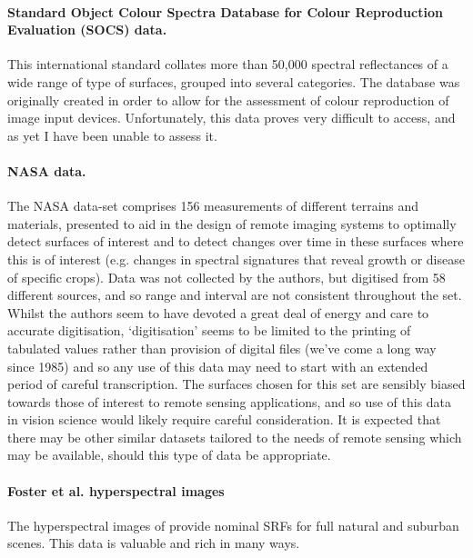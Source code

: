 \paragraph{Standard Object Colour Spectra Database for Colour Reproduction Evaluation (SOCS) data.}
This international standard \citep{tajima_development_1998,iso/tc_130_graphic_technology_iso/tr_2003} collates more than 50,000 spectral reflectances of a wide range of type of surfaces, grouped into several categories. The database was originally created in order to allow for the assessment of colour reproduction of image input devices. Unfortunately, this data proves very difficult to access, and as yet I have been unable to assess it.

\paragraph{NASA data.}
The NASA data-set \citep{david_e._bowker_spectral_1985} comprises 156 measurements of different terrains and materials, presented to aid in the design of remote imaging systems to optimally detect surfaces of interest and to detect changes over time in these surfaces where this is of interest (e.g. changes in spectral signatures that reveal growth or disease of specific crops). Data was not collected by the authors, but digitised from 58 different sources, and so range and interval are not consistent throughout the set. Whilst the authors seem to have devoted a great deal of energy and care to accurate digitisation, `digitisation' seems to be limited to the printing of tabulated values rather than provision of digital files (we've come a long way since 1985) and so any use of this data may need to start with an extended period of careful transcription. The surfaces chosen for this set are sensibly biased towards those of interest to remote sensing applications, and so use of this data in vision science would likely require careful consideration. It is expected that there may be other similar datasets tailored to the needs of remote sensing which may be available, should this type of data be appropriate.

\paragraph{Foster et al. hyperspectral images}
The hyperspectral images of \citet{nascimento_statistics_2002,foster_frequency_2006} provide nominal \glspl{SRF} for full natural and suburban scenes. This data is valuable and rich in many ways. 

